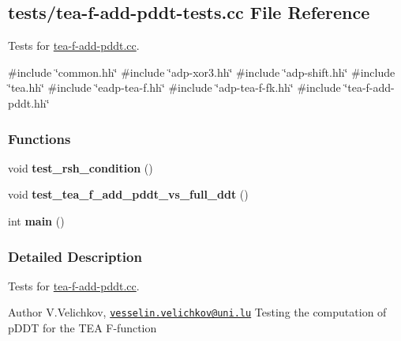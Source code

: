 \hypertarget{tea-f-add-pddt-tests_8cc}{\subsection{tests/tea-\/f-\/add-\/pddt-\/tests.cc \-File \-Reference}
\label{tea-f-add-pddt-tests_8cc}
}


\-Tests for \hyperlink{tea-f-add-pddt_8cc}{tea-\/f-\/add-\/pddt.\-cc}.  


{\ttfamily \#include \char`\"{}common.\-hh\char`\"{}}\*
{\ttfamily \#include \char`\"{}adp-\/xor3.\-hh\char`\"{}}\*
{\ttfamily \#include \char`\"{}adp-\/shift.\-hh\char`\"{}}\*
{\ttfamily \#include \char`\"{}tea.\-hh\char`\"{}}\*
{\ttfamily \#include \char`\"{}eadp-\/tea-\/f.\-hh\char`\"{}}\*
{\ttfamily \#include \char`\"{}adp-\/tea-\/f-\/fk.\-hh\char`\"{}}\*
{\ttfamily \#include \char`\"{}tea-\/f-\/add-\/pddt.\-hh\char`\"{}}\*
\subsubsection*{\-Functions}
\begin{DoxyCompactItemize}
\item 
\hypertarget{tea-f-add-pddt-tests_8cc_a104d13a8751bed75e29438538148a232}{void {\bfseries test\-\_\-rsh\-\_\-condition} ()}\label{tea-f-add-pddt-tests_8cc_a104d13a8751bed75e29438538148a232}

\item 
\hypertarget{tea-f-add-pddt-tests_8cc_a8832bb5cd372f8c607e4e1f5a0711511}{void {\bfseries test\-\_\-tea\-\_\-f\-\_\-add\-\_\-pddt\-\_\-vs\-\_\-full\-\_\-ddt} ()}\label{tea-f-add-pddt-tests_8cc_a8832bb5cd372f8c607e4e1f5a0711511}

\item 
\hypertarget{tea-f-add-pddt-tests_8cc_ae66f6b31b5ad750f1fe042a706a4e3d4}{int {\bfseries main} ()}\label{tea-f-add-pddt-tests_8cc_ae66f6b31b5ad750f1fe042a706a4e3d4}

\end{DoxyCompactItemize}


\subsubsection{\-Detailed \-Description}
\-Tests for \hyperlink{tea-f-add-pddt_8cc}{tea-\/f-\/add-\/pddt.\-cc}. \begin{DoxyAuthor}{\-Author}
\-V.\-Velichkov, \href{mailto:vesselin.velichkov@uni.lu}{\tt vesselin.\-velichkov@uni.\-lu} \-Testing the computation of p\-D\-D\-T for the \-T\-E\-A \-F-\/function 
\end{DoxyAuthor}
